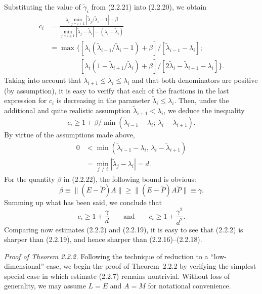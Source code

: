 \documentclass[11pt,oneside]{book}
\begin{document}
Substituting the value of $\tilde{\gamma}_i$ from (2.2.21) into (2.2.20), we obtain
\[
\begin{aligned}
c_i &= \frac{\lambda_i \min\limits_{j = i \pm 1} | \tilde{\lambda}_j / \tilde{\lambda}_i - 1 | + \beta}{\min\limits_{j = i \pm 1} | \tilde{\lambda}_j - \tilde{\lambda}_i | - (\lambda_i - \tilde{\lambda}_i)} \\
&= \max \bigl\{ [ \lambda_i (\tilde{\lambda}_{i-1} / \tilde{\lambda}_i - 1) + \beta ] / [ \tilde{\lambda}_{i-1} - \lambda_i ] ; \\
&\phantom{= \max \bigl\{ } [ \lambda_i (1 - \tilde{\lambda}_{i+1} / \tilde{\lambda}_i) + \beta ] / [ 2\tilde{\lambda}_i - \tilde{\lambda}_{i+1} - \lambda_i ] \bigr\} .
\end{aligned}
\]
Taking into account that $\tilde{\lambda}_{i+1} \leqslant \tilde{\lambda}_i \leqslant \lambda_i$ and that both denominators are positive (by assumption), it is easy to verify that each of the fractions in the last expression for $c_i$ is decreasing in the parameter $\tilde{\lambda}_i \leqslant \lambda_i$. Then, under the additional and quite realistic assumption $\tilde{\lambda}_{i+1} < \lambda_i$, we deduce the inequality
\[
c_i \geqslant 1 + \beta / \min(\tilde{\lambda}_{i-1} - \lambda_i; \, \lambda_i - \tilde{\lambda}_{i+1}). \tag{2.2.22}
\]
By virtue of the assumptions made above,
\[
\begin{aligned}
0 &< \min(\tilde{\lambda}_{i-1} - \lambda_i, \, \lambda_i - \tilde{\lambda}_{i+1}) \\
&= \min_{j \neq i} | \tilde{\lambda}_j - \lambda_i | = d .
\end{aligned}
\]
For the quantity $\beta$ in (2.2.22), the following bound is obvious:
\[
\beta \equiv \| (E - \widetilde{P}) A \| \geqslant \| (E - \widetilde{P}) A \widetilde{P} \| \equiv \gamma .
\]
Summing up what has been said, we conclude that
\[
c_i \geqslant 1 + \frac{\gamma}{d} \qquad \text{and} \qquad c_i \geqslant 1 + \frac{\gamma^2}{d^2} . %
\]
Comparing now estimates (2.2.2) and (2.2.19), it is easy to see that (2.2.2) is sharper than (2.2.19), and hence sharper than (2.2.16)--(2.2.18).

\textit{Proof of Theorem 2.2.2.} Following the technique of reduction to a ``low-dimensional'' case, we begin the proof of Theorem~2.2.2 by verifying the simplest special case in which estimate (2.2.7) remains nontrivial. Without loss of generality, we may assume $L = E$ and $A = M$ for notational convenience.
\end{document}
